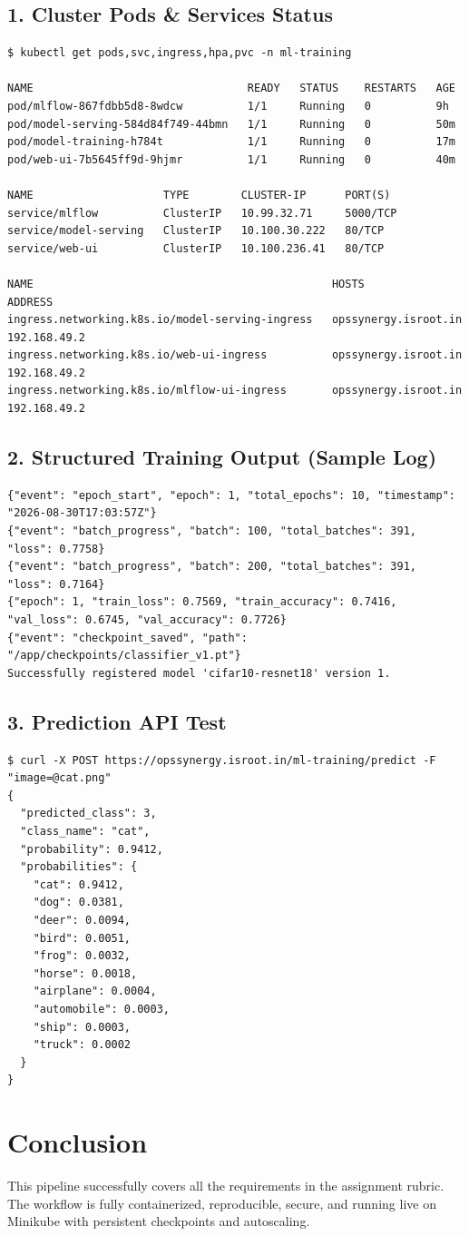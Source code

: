\documentclass[11pt,a4paper]{article}
\begin{document}
\subsection{1. Cluster Pods \& Services Status}
\begin{lstlisting}
$ kubectl get pods,svc,ingress,hpa,pvc -n ml-training

NAME                                 READY   STATUS    RESTARTS   AGE
pod/mlflow-867fdbb5d8-8wdcw          1/1     Running   0          9h
pod/model-serving-584d84f749-44bmn   1/1     Running   0          50m
pod/model-training-h784t             1/1     Running   0          17m
pod/web-ui-7b5645ff9d-9hjmr          1/1     Running   0          40m

NAME                    TYPE        CLUSTER-IP      PORT(S)
service/mlflow          ClusterIP   10.99.32.71     5000/TCP
service/model-serving   ClusterIP   10.100.30.222   80/TCP
service/web-ui          ClusterIP   10.100.236.41   80/TCP

NAME                                              HOSTS                  ADDRESS
ingress.networking.k8s.io/model-serving-ingress   opssynergy.isroot.in   192.168.49.2
ingress.networking.k8s.io/web-ui-ingress          opssynergy.isroot.in   192.168.49.2
ingress.networking.k8s.io/mlflow-ui-ingress       opssynergy.isroot.in   192.168.49.2
\end{lstlisting}

\subsection{2. Structured Training Output (Sample Log)}
\begin{lstlisting}
{"event": "epoch_start", "epoch": 1, "total_epochs": 10, "timestamp": "2026-08-30T17:03:57Z"}
{"event": "batch_progress", "batch": 100, "total_batches": 391, "loss": 0.7758}
{"event": "batch_progress", "batch": 200, "total_batches": 391, "loss": 0.7164}
{"epoch": 1, "train_loss": 0.7569, "train_accuracy": 0.7416, "val_loss": 0.6745, "val_accuracy": 0.7726}
{"event": "checkpoint_saved", "path": "/app/checkpoints/classifier_v1.pt"}
Successfully registered model 'cifar10-resnet18' version 1.
\end{lstlisting}

\subsection{3. Prediction API Test}
\begin{lstlisting}
$ curl -X POST https://opssynergy.isroot.in/ml-training/predict -F "image=@cat.png"
{
  "predicted_class": 3,
  "class_name": "cat",
  "probability": 0.9412,
  "probabilities": {
    "cat": 0.9412,
    "dog": 0.0381,
    "deer": 0.0094,
    "bird": 0.0051,
    "frog": 0.0032,
    "horse": 0.0018,
    "airplane": 0.0004,
    "automobile": 0.0003,
    "ship": 0.0003,
    "truck": 0.0002
  }
}
\end{lstlisting}

\section{Conclusion}
This pipeline successfully covers all the requirements in the assignment rubric. The workflow is fully containerized, reproducible, secure, and running live on Minikube with persistent checkpoints and autoscaling.
\end{document}
